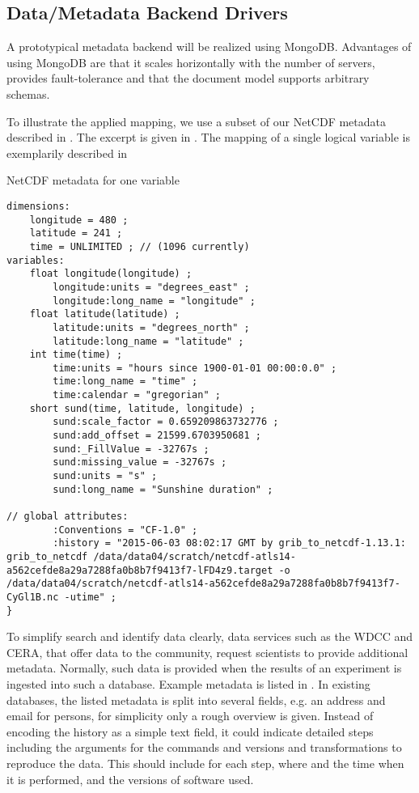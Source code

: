 \subsection{Data/Metadata Backend Drivers}
A prototypical metadata backend will be realized using MongoDB.
Advantages of using MongoDB are that it scales horizontally with the number of servers, provides fault-tolerance and that the document model supports arbitrary schemas.



To illustrate the applied mapping, we use a subset of our NetCDF metadata described in .
The excerpt is given in .
The mapping of a single logical variable is exemplarily described in


\begin{tcbcode}[label={lst:NetCDF-data-map}]{NetCDF metadata for one variable}
\begin{lstlisting}
dimensions:
	longitude = 480 ;
	latitude = 241 ;
	time = UNLIMITED ; // (1096 currently)
variables:
	float longitude(longitude) ;
		longitude:units = "degrees_east" ;
		longitude:long_name = "longitude" ;
	float latitude(latitude) ;
		latitude:units = "degrees_north" ;
		latitude:long_name = "latitude" ;
	int time(time) ;
		time:units = "hours since 1900-01-01 00:00:0.0" ;
		time:long_name = "time" ;
		time:calendar = "gregorian" ;
	short sund(time, latitude, longitude) ;
		sund:scale_factor = 0.659209863732776 ;
		sund:add_offset = 21599.6703950681 ;
		sund:_FillValue = -32767s ;
		sund:missing_value = -32767s ;
		sund:units = "s" ;
		sund:long_name = "Sunshine duration" ;

// global attributes:
		:Conventions = "CF-1.0" ;
		:history = "2015-06-03 08:02:17 GMT by grib_to_netcdf-1.13.1: grib_to_netcdf /data/data04/scratch/netcdf-atls14-a562cefde8a29a7288fa0b8b7f9413f7-lFD4z9.target -o /data/data04/scratch/netcdf-atls14-a562cefde8a29a7288fa0b8b7f9413f7-CyGl1B.nc -utime" ;
}
\end{lstlisting}
\end{tcbcode}

To simplify search and identify data clearly, data services such as the WDCC and CERA, that offer data to the community, request scientists to provide additional metadata.
Normally, such data is provided when the results of an experiment is ingested into such a database.
Example metadata is listed in .
In existing databases, the listed metadata is split into several fields, e.g. an address and email for persons, for simplicity only a rough overview is given.
Instead of encoding the history as a simple text field, it could
indicate detailed steps including the arguments for the commands and versions and transformations to reproduce the data.
This should include for each step, where and the time when it is performed, and the versions of software used.

